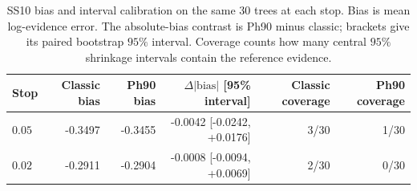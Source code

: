 
\begin{table}[t]
\centering
\scriptsize
\caption{SS10 bias and interval calibration on the same 30 trees at each stop.
Bias is mean log-evidence error. The absolute-bias contrast is Ph90 minus classic;
brackets give its paired bootstrap $95\%$ interval. Coverage counts how many
central $95\%$ shrinkage intervals contain the reference evidence.}
\label{tab:ss10_bias_coverage}
\begin{tabular}{lrrrrr}
\toprule
Stop & Classic bias & Ph90 bias & $\Delta|\mathrm{bias}|$ [95\% interval]
& Classic coverage & Ph90 coverage\\
\midrule

$0.05$ & -0.3497 & -0.3455 & -0.0042 [-0.0242, +0.0176] & 3/30 & 1/30 \\

$0.02$ & -0.2911 & -0.2904 & -0.0008 [-0.0094, +0.0069] & 2/30 & 0/30 \\

\bottomrule
\end{tabular}
\end{table}
